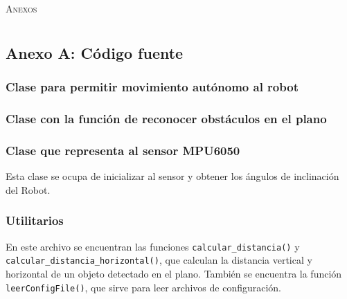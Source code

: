 \chapter*{}
\pagestyle{plain}

\begin{center}
\Huge{\textsc{Anexos}}
\end{center}


\chapter*{}

\pagestyle{myheadings}

\section*{Anexo A: Código fuente}
\subsection*{Clase para permitir movimiento autónomo al robot}


\subsection*{Clase con la función de reconocer obstáculos en el plano}



\subsection*{Clase que representa al sensor MPU6050}
Esta clase se ocupa de inicializar al sensor y obtener los ángulos de inclinación del Robot.


\subsection*{Utilitarios}
En este archivo se encuentran las funciones \texttt{calcular\_distancia()} y \texttt{calcular\_distancia\_horizontal()}, que calculan la distancia vertical y horizontal de un objeto detectado en el plano. También se encuentra la función \texttt{leerConfigFile()}, que sirve para leer archivos de configuración.

